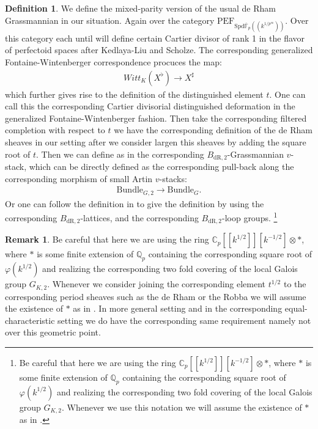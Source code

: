 \documentclass[12pt]{book}
\theoremstyle{definition}
\newtheorem{definition}{Definition}
\newtheorem{remark}{Remark}
\begin{document}
\begin{definition}
We define the mixed-parity version of the usual de Rham Grassmannian in our situation. Again over the category $\mathrm{PEF}_{\mathrm{\mathrm{Spd}}\overline{\mathbb{F}}_p((k^{1/p^\infty}))}$. Over this category each until will define certain Cartier divisor of rank 1 in the flavor of perfectoid spaces after Kedlaya-Liu and Scholze. The corresponding generalized Fontaine-Wintenberger correspondence procuces the map:
\begin{align}
Witt_K(X^\flat) \rightarrow X^\sharp
\end{align}
which further gives rise to the definition of the distinguished element $t$. One can call this the corresponding Cartier divisorial distinguished deformation in the generalized Fontaine-Wintenberger fashion. Then take the corresponding filtered completion with respect to $t$ we have the corresponding definition of the de Rham sheaves in our setting after we consider largen this sheaves by adding the square root of $t$. Then we can define as in \cite{FS} the corresponding $B_\mathrm{dR,2}$-Grassmannian $v$-stack, which can be directly defined as the corresponding pull-back along the corresponding morphism of small Artin $v$-stacks:
\begin{align}
\mathrm{Bundle}_{G,2} \rightarrow \mathrm{Bundle}_{G}.
\end{align}
Or one can follow the definition in \cite{FS} to give the definition by using the corresponding $B_\mathrm{dR,2}$-lattices, and the corresponding $B_\mathrm{dR,2}$-loop groups. \footnote{Be careful that here we are using the ring $\mathbb{C}_p[[k^{1/2}]][k^{-1/2}]\otimes *$, where $*$ is some finite extension of $\mathbb{Q}_p$ containing the corresponding square root of $\varphi(k^{1/2})$ and realizing the corresponding two fold covering of the local Galois group $G_{K,2}$. Whenever we use this notation we will assume the existence of $*$ as in \cite{BS}.}
\end{definition}


\begin{remark}
Be careful that here we are using the ring $\mathbb{C}_p[[k^{1/2}]][k^{-1/2}]\otimes *$, where $*$ is some finite extension of $\mathbb{Q}_p$ containing the corresponding square root of $\varphi(k^{1/2})$ and realizing the corresponding two fold covering of the local Galois group $G_{K,2}$. Whenever we consider joining the corresponding element $t^{1/2}$ to the corresponding period sheaves such as the de Rham or the Robba we will assume the existence of $*$ as in \cite{BS}. In more general setting and in the corresponding equal-characteristic setting we do have the corresponding same requirement namely not over this geometric point.

\end{remark}
\end{document}

